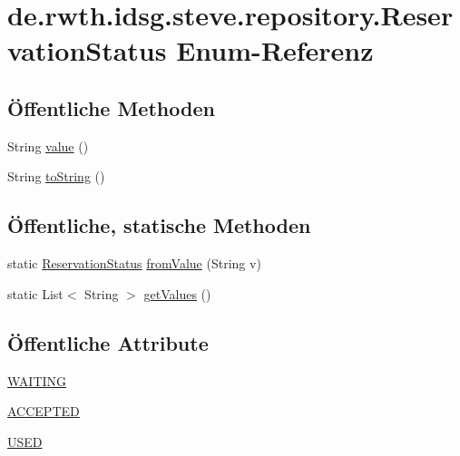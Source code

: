 \hypertarget{enumde_1_1rwth_1_1idsg_1_1steve_1_1repository_1_1_reservation_status}{\section{de.\-rwth.\-idsg.\-steve.\-repository.\-Reservation\-Status Enum-\/\-Referenz}
\label{enumde_1_1rwth_1_1idsg_1_1steve_1_1repository_1_1_reservation_status}
}
\subsection*{Öffentliche Methoden}
\begin{DoxyCompactItemize}
\item 
String \hyperlink{enumde_1_1rwth_1_1idsg_1_1steve_1_1repository_1_1_reservation_status_a0661b2411dc0a7d06f2e73a42288ce36}{value} ()
\item 
String \hyperlink{enumde_1_1rwth_1_1idsg_1_1steve_1_1repository_1_1_reservation_status_a265349685cbf5f8e387ed72d6c7ee8f0}{to\-String} ()
\end{DoxyCompactItemize}
\subsection*{Öffentliche, statische Methoden}
\begin{DoxyCompactItemize}
\item 
static \hyperlink{enumde_1_1rwth_1_1idsg_1_1steve_1_1repository_1_1_reservation_status}{Reservation\-Status} \hyperlink{enumde_1_1rwth_1_1idsg_1_1steve_1_1repository_1_1_reservation_status_a200aecca7ea0a5b82bb90c2359e98759}{from\-Value} (String v)
\item 
static List$<$ String $>$ \hyperlink{enumde_1_1rwth_1_1idsg_1_1steve_1_1repository_1_1_reservation_status_a3e2dc86a6adcf2705375945854bf3b2b}{get\-Values} ()
\end{DoxyCompactItemize}
\subsection*{Öffentliche Attribute}
\begin{DoxyCompactItemize}
\item 
\hyperlink{enumde_1_1rwth_1_1idsg_1_1steve_1_1repository_1_1_reservation_status_a8e53c1b90c78fe4502e0773ef54db906}{W\-A\-I\-T\-I\-N\-G}
\item 
\hyperlink{enumde_1_1rwth_1_1idsg_1_1steve_1_1repository_1_1_reservation_status_a57d4572a09ac1208ff3f9043388d99c3}{A\-C\-C\-E\-P\-T\-E\-D}
\item 
\hyperlink{enumde_1_1rwth_1_1idsg_1_1steve_1_1repository_1_1_reservation_status_a6b1991b30f8328e3ba9bc2e1711b1ca9}{U\-S\-E\-D}
\end{DoxyCompactItemize}


